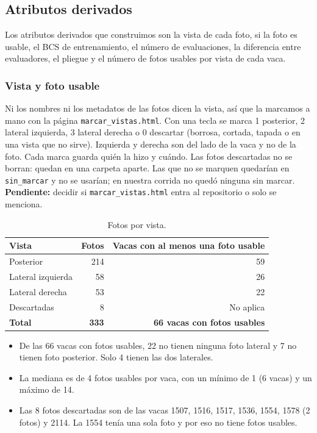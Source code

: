 \subsection{Atributos derivados}

Los atributos derivados que construimos son la vista de cada foto, si la foto es usable, el BCS de entrenamiento, el número de evaluaciones, la diferencia entre evaluadores, el pliegue y el número de fotos usables por vista de cada vaca.

\subsubsection*{Vista y foto usable}

Ni los nombres ni los metadatos de las fotos dicen la vista, así que la marcamos a mano con la página \nolinkurl{marcar_vistas.html}. Con una tecla se marca 1 posterior, 2 lateral izquierda, 3 lateral derecha o 0 descartar (borrosa, cortada, tapada o en una vista que no sirve). Izquierda y derecha son del lado de la vaca y no de la foto. Cada marca guarda quién la hizo y cuándo. Las fotos descartadas no se borran: quedan en una carpeta aparte. Las que no se marquen quedarían en \nolinkurl{sin_marcar} y no se usarían; en nuestra corrida no quedó ninguna sin marcar. \textbf{Pendiente:} decidir si \nolinkurl{marcar_vistas.html} entra al repositorio o solo se menciona.

\begin{table}[H]
  \centering
  \caption{Fotos por vista.}
  \label{tab:vistas}
  \begin{tabular}{lrr}
    \toprule
    Vista & Fotos & Vacas con al menos una foto usable \\
    \midrule
    Posterior & 214 & 59 \\
    Lateral izquierda & 58 & 26 \\
    Lateral derecha & 53 & 22 \\
    Descartadas & 8 & No aplica \\
    \midrule
    \textbf{Total} & \textbf{333} & \textbf{66 vacas con fotos usables} \\
    \bottomrule
  \end{tabular}
\end{table}

\begin{itemize}
  \item De las 66 vacas con fotos usables, 22 no tienen ninguna foto lateral y 7 no tienen foto posterior. Solo 4 tienen las dos laterales.
  \item La mediana es de 4 fotos usables por vaca, con un mínimo de 1 (6 vacas) y un máximo de 14.
  \item Las 8 fotos descartadas son de las vacas 1507, 1516, 1517, 1536, 1554, 1578 (2 fotos) y 2114. La 1554 tenía una sola foto y por eso no tiene fotos usables.
\end{itemize}

